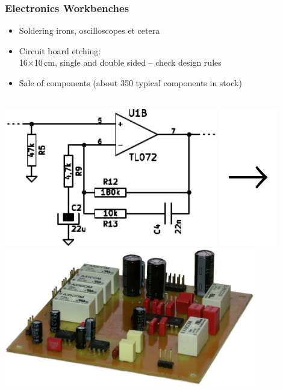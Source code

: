 \documentclass[t]{beamer}
\begin{document}
\begin{frame}
    \frametitle{Electronics Workbenches}
    \begin{itemize}
        \item Soldering irons, oscilloscopes et cetera
        \item Circuit board etching:\\
            16$\times$10\,cm, single and double sided -- check design rules
        \item Sale of components (about 350 typical components in stock)
    \end{itemize}
        \begin{center}
    ~\\
        \includegraphics[height=6cm]{../img/schaltplan.pdf}
        \includegraphics[height=6cm]{../img/pfeil.pdf}
        \includegraphics[height=6cm]{../img/platine_perspektivisch.png}
    \end{center}
\end{frame}
\end{document}
